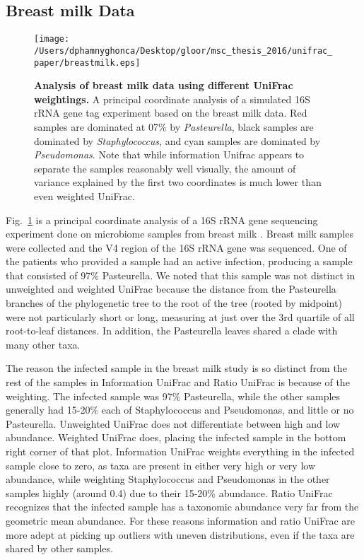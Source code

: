 \documentclass[10pt,letterpaper]{article}
\begin{document}
\FloatBarrier

\subsection{Breast milk Data}

\begin{figure}[h]
\texttt{[image: /Users/dphamnyghonca/Desktop/gloor/msc\_thesis\_2016/unifrac\_paper/breastmilk.eps]}
\caption[Analysis of breast milk data using different UniFrac weightings.]{{\bf Analysis of breast milk data using different UniFrac weightings. }
A principal coordinate analysis of a simulated 16S rRNA gene tag experiment based on the breast milk data. Red samples are dominated at 07\% by \textit{Pasteurella}, black samples are dominated by \textit{Staphylococcus}, and cyan samples are dominated by \textit{Pseudomonas}. Note that while information Unifrac appears to separate the samples reasonably well visually, the amount of variance explained by the first two coordinates is much lower than even weighted UniFrac.}
\label{fig7}
\end{figure}

Fig.~\ref{fig7} is a principal coordinate analysis of a 16S rRNA gene sequencing experiment done on microbiome samples from breast milk \cite{urbaniak2016human}. Breast milk samples were collected and the V4 region of the 16S rRNA gene was sequenced. One of the patients who provided a sample had an active infection, producing a sample that consisted of 97\% Pasteurella. We noted that this sample was not distinct in unweighted and weighted UniFrac because the distance from the Pasteurella branches of the phylogenetic tree to the root of the tree (rooted by midpoint) were not particularly short or long, measuring at just over the 3rd quartile of all root-to-leaf distances. In addition, the Pasteurella leaves shared a clade with many other taxa.

The reason the infected sample in the breast milk study is so distinct from the rest of the samples in Information UniFrac and Ratio UniFrac is because of the weighting. The infected sample was 97\% Pasteurella, while the other samples generally had 15-20\% each of Staphylococcus and Pseudomonas, and little or no Pasteurella. Unweighted UniFrac does not differentiate between high and low abundance. Weighted UniFrac does, placing the infected sample in the bottom right corner of that plot. Information UniFrac weights everything in the infected sample close to zero, as taxa are present in either very high or very low abundance, while weighting Staphylococcus and Pseudomonas in the other samples highly (around 0.4) due to their 15-20\% abundance. Ratio UniFrac recognizes that the infected sample has a taxonomic abundance very far from the geometric mean abundance. For these reasons information and ratio UniFrac are more adept at picking up outliers with uneven distributions, even if the taxa are shared by other samples.
\end{document}
